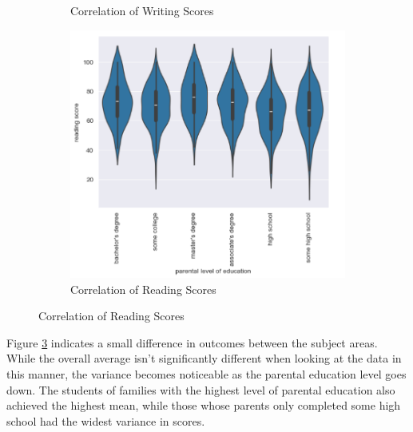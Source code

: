 \documentclass[man,floatsintext]{apa6} %
\begin{document}
\begin{figure}[H]
\begin{subfigure}[b]{0.28\textwidth}
    \caption{Correlation of Writing Scores}
    \label{fig:read1}
    \end{subfigure}
    \begin{subfigure}[b]{0.28\textwidth}
    \includegraphics[width=\linewidth]{ReadingVsParent.png}
    \caption{Correlation of Reading Scores}
    \label{fig:write1}
    \end{subfigure}
    \label{fig:FirstOne}
\end{figure}

Figure \ref{fig:FirstOne} indicates a small difference in outcomes between the subject areas. While the overall average isn't significantly different when looking at the data in this manner, the variance becomes noticeable as the parental education level goes down. The students of families with the highest level of parental education also achieved the highest mean, while those whose parents only completed some high school had the widest variance in scores.
\end{document}
